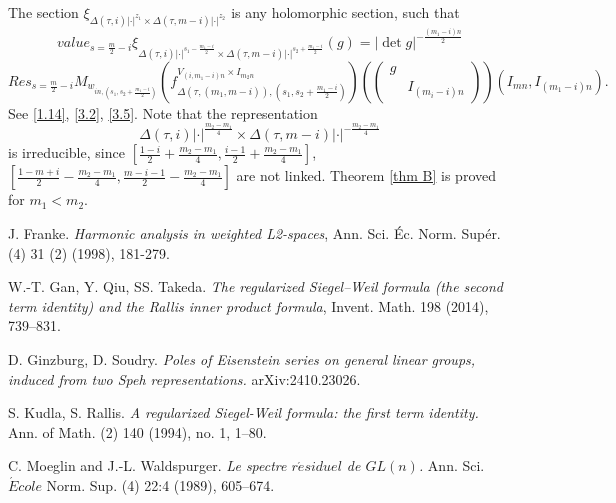 \documentclass[12pts]{amsart}
\begin{document}
The section $\xi_{\Delta(\tau,i)|\cdot|^{z_1}\times \Delta(\tau,m-i)|\cdot|^{z_2}}$ is any holomorphic section, such that
\begin{equation}\label{3.8}
	value_{s=\frac{m}{2}-i}\xi_{\Delta(\tau,i)|\cdot|^{s_1-\frac{m_1-i}{2}}\times \Delta(\tau,m-i)|\cdot|^{s_2+\frac{m_1-i}{2}}}(g)=|\det g|^{-\frac{(m_1-i) n}{2}}
\end{equation}
$$
Res_{s=\frac{m}{2}-i}M_{w_{in,(s_1,s_2+\frac{m_1-i}{2})}}(f_{\Delta(\tau,(m_1,m-i)),(s_1,s_2+\frac{m_1-i}{2})}^{V_{(i,m_1-i)n}\times I_{m_2n}})(\begin{pmatrix}g\\&I_{(m_i-i)n}\end{pmatrix})(I_{mn}, I_{(m_1-i)n}).
$$
See \eqref{1.14}, \eqref{3.2}, \eqref{3.5}. Note that the representation $$\Delta(\tau,i)|\cdot|^{\frac{m_2-m_1}{4}}\times \Delta(\tau,m-i)|\cdot|^{-\frac{m_2-m_1}{4}}$$ is irreducible, since $[\frac{1-i}{2}+\frac{m_2-m_1}{4},\frac{i-1}{2}+\frac{m_2-m_1}{4}]$, $[\frac{1-m+i}{2}-\frac{m_2-m_1}{4},\frac{m-i-1}{2}-\frac{m_2-m_1}{4}]$ are not linked. Theorem \ref{thm B} is proved for $m_1< m_2$.
    
    
    
    
    
    
    
    
    
    
    
    
    
    
    
    
    	
    	
  \begin{thebibliography}{}
  	
 J. Franke. \textit{Harmonic analysis in weighted L2-spaces}, Ann. Sci. Éc. Norm. Supér. (4) 31 (2) (1998), 181-279. 

 W.-T. Gan, Y. Qiu, SS. Takeda. \textit{The regularized Siegel–Weil formula (the second term
identity) and the Rallis inner product formula}, Invent. Math. 198 (2014), 739–831. 	
  	
 D. Ginzburg, D. Soudry. \textit{Poles of Eisenstein series on general linear groups, induced from two Speh representations.} arXiv:2410.23026. 

 S. Kudla, S. Rallis. 
\textit{ A regularized Siegel-Weil formula: the first term identity.}
Ann. of Math. (2) 140 (1994), no. 1, 1–80.

C. Moeglin and J.-L. Waldspurger. \textit{Le spectre $r\acute{e}siduel$ de $GL(n)$.} Ann. Sci. $\acute{E}cole$ Norm. Sup. (4) 22:4 (1989), 605–674. 	
  	
  	
  	
  \end{thebibliography}  	
    	
  
\end{document}
